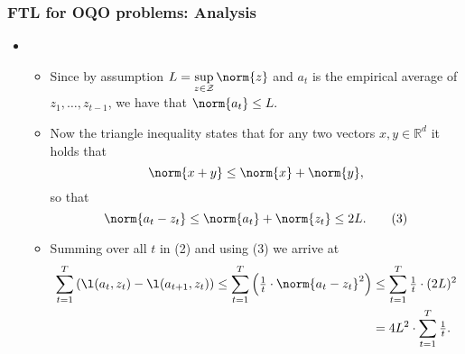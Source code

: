 \documentclass[11pt,compress,t,notes=noshow, xcolor=table]{beamer}
\begin{document}
\begin{frame} 
	\frametitle{FTL for OQO problems: Analysis}
	\small
	


	\begin{itemize}	
		


		\pause
		\item[] 
		
		
		\begin{itemize}	
				\footnotesize
				
				\item Since by assumption $L = \sup\limits_{z \in \Zspace} \norm{z}$ and $a_t$ is the empirical average of $z_1, \ldots, z_{t-1}$, we have that $\norm{a_t} \leq L.$
				\pause
				 \item Now the triangle inequality states that for any two vectors $x, y \in \mathbb{R}^d$ it holds that 
				\begin{equation*}
						\norm{x + y} \leq \norm{x} + \norm{y},
					\end{equation*} 
				 so that
				\begin{equation*} 
						\norm{a_t - z_t} \leq \norm{a_t} + \norm{z_t} \leq 2L.
						\tag{3}
					\end{equation*}
				\pause 

				 \item Summing over all $t$ in (2) and using (3) we arrive at
				\begin{equation*}
						\begin{split}
								\sum\limits_{t=1}^T \left(\l(a_t,z_t) - \l(a_{t+1},z_t)  \right) 
								 \leq \sum\limits_{t=1}^T \left(\tfrac{1}{t} \cdot \norm{a_t - z_t}^2 \right) 
								&\leq  \sum\limits_{t=1}^T \tfrac{1}{t} \cdot (2L)^2 \\
								 &= 4L^2 \cdot \sum\limits_{t=1}^T \tfrac{1}{t}.
							\end{split}
					\end{equation*}
				
			\end{itemize}
	\end{itemize}
\end{frame}
\end{document}

